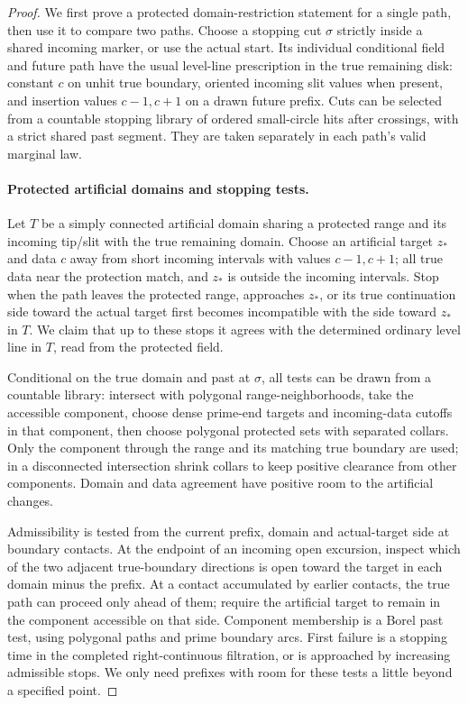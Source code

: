 \begin{proof}
We first prove a protected domain-restriction statement for a single path, then use it to compare two paths.  Choose a stopping cut $\sigma$ strictly inside a shared incoming marker, or use the actual start.  Its individual conditional field and future path have the usual level-line prescription in the true remaining disk: constant $c$ on unhit true boundary, oriented incoming slit values when present, and insertion values $c-1,c+1$ on a drawn future prefix.  Cuts can be selected from a countable stopping library of ordered small-circle hits after crossings, with a strict shared past segment.  They are taken separately in each path's valid marginal law.

\paragraph{Protected artificial domains and stopping tests.}
Let $T$ be a simply connected artificial domain sharing a protected range and its incoming tip/slit with the true remaining domain.  Choose an artificial target $z_*$ and data $c$ away from short incoming intervals with values $c-1,c+1$; all true data near the protection match, and $z_*$ is outside the incoming intervals.  Stop when the path leaves the protected range, approaches $z_*$, or its true continuation side toward the actual target first becomes incompatible with the side toward $z_*$ in $T$.  We claim that up to these stops it agrees with the determined ordinary level line in $T$, read from the protected field.

Conditional on the true domain and past at $\sigma$, all tests can be drawn from a countable library: intersect with polygonal range-neighborhoods, take the accessible component, choose dense prime-end targets and incoming-data cutoffs in that component, then choose polygonal protected sets with separated collars.  Only the component through the range and its matching true boundary are used; in a disconnected intersection shrink collars to keep positive clearance from other components.  Domain and data agreement have positive room to the artificial changes.

Admissibility is tested from the current prefix, domain and actual-target side at boundary contacts.  At the endpoint of an incoming open excursion, inspect which of the two adjacent true-boundary directions is open toward the target in each domain minus the prefix.  At a contact accumulated by earlier contacts, the true path can proceed only ahead of them; require the artificial target to remain in the component accessible on that side.  Component membership is a Borel past test, using polygonal paths and prime boundary arcs.  First failure is a stopping time in the completed right-continuous filtration, or is approached by increasing admissible stops.  We only need prefixes with room for these tests a little beyond a specified point.


\end{proof}
